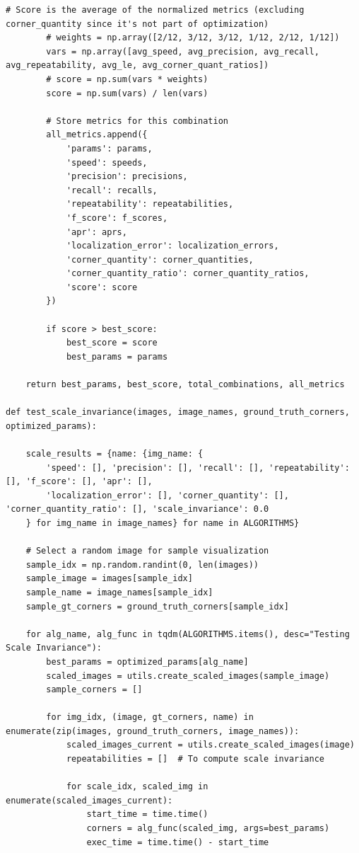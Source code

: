 \documentclass[journal]{IEEEtran}
\begin{document}
\begin{lstlisting}[style=python, caption={Driver Script for Project}, label={lst:driver}]
        # Score is the average of the normalized metrics (excluding corner_quantity since it's not part of optimization)
        # weights = np.array([2/12, 3/12, 3/12, 1/12, 2/12, 1/12])
        vars = np.array([avg_speed, avg_precision, avg_recall, avg_repeatability, avg_le, avg_corner_quant_ratios])
        # score = np.sum(vars * weights)
        score = np.sum(vars) / len(vars)
        
        # Store metrics for this combination
        all_metrics.append({
            'params': params,
            'speed': speeds,
            'precision': precisions,
            'recall': recalls,
            'repeatability': repeatabilities,
            'f_score': f_scores,
            'apr': aprs,
            'localization_error': localization_errors,
            'corner_quantity': corner_quantities,
            'corner_quantity_ratio': corner_quantity_ratios,
            'score': score
        })
        
        if score > best_score:
            best_score = score
            best_params = params
    
    return best_params, best_score, total_combinations, all_metrics

def test_scale_invariance(images, image_names, ground_truth_corners, optimized_params):

    scale_results = {name: {img_name: {
        'speed': [], 'precision': [], 'recall': [], 'repeatability': [], 'f_score': [], 'apr': [],
        'localization_error': [], 'corner_quantity': [], 'corner_quantity_ratio': [], 'scale_invariance': 0.0
    } for img_name in image_names} for name in ALGORITHMS}
        
    # Select a random image for sample visualization
    sample_idx = np.random.randint(0, len(images))
    sample_image = images[sample_idx]
    sample_name = image_names[sample_idx]
    sample_gt_corners = ground_truth_corners[sample_idx]
    
    for alg_name, alg_func in tqdm(ALGORITHMS.items(), desc="Testing Scale Invariance"):
        best_params = optimized_params[alg_name]
        scaled_images = utils.create_scaled_images(sample_image)
        sample_corners = []
        
        for img_idx, (image, gt_corners, name) in enumerate(zip(images, ground_truth_corners, image_names)):
            scaled_images_current = utils.create_scaled_images(image)
            repeatabilities = []  # To compute scale invariance
            
            for scale_idx, scaled_img in enumerate(scaled_images_current):
                start_time = time.time()
                corners = alg_func(scaled_img, args=best_params)
                exec_time = time.time() - start_time
                

\end{lstlisting}
\end{document}
